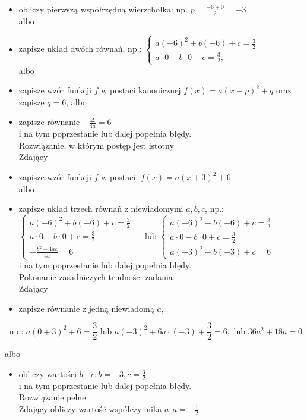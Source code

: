 \documentclass[10pt]{article}
\begin{document}
\begin{itemize}
  \item obliczy pierwszą współrzędną wierzchołka: np. $p=\frac{-6+0}{2}=-3$\\
albo
  \item zapisze układ dwóch równań, np.: $\left\{\begin{array}{l}a(-6)^{2}+b(-6)+c=\frac{3}{2} \\ a \cdot 0-b \cdot 0+c=\frac{3}{2},\end{array}\right.$\\
albo
  \item zapisze wzór funkcji $f$ w postaci kanonicznej $f(x)=a(x-p)^{2}+q$ oraz zapisze $q=6$, albo
  \item zapisze równanie $-\frac{\Delta}{4 a}=6$\\
i na tym poprzestanie lub dalej popełnia błędy.\\
Rozwiązanie, w którym postęp jest istotny\\
Zdający
  \item zapisze wzór funkcji $f$ w postaci: $f(x)=a(x+3)^{2}+6$\\
albo
  \item zapisze układ trzech równań z niewiadomymi $a, b, c$, np.:\\
$\left\{\begin{array}{l}a(-6)^{2}+b(-6)+c=\frac{3}{2} \\ a \cdot 0-b \cdot 0+c=\frac{3}{2} \\ -\frac{b^{2}-4 a c}{4 a}=6\end{array} \quad\right.$ lub $\left\{\begin{array}{l}a(-6)^{2}+b(-6)+c=\frac{3}{2} \\ a \cdot 0-b \cdot 0+c=\frac{3}{2} \\ a(-3)^{2}+b(-3)+c=6\end{array}\right.$\\
i na tym poprzestanie lub dalej popełnia błędy.\\
Pokonanie zasadniczych trudności zadania\\
Zdający
  \item zapisze równanie z jedną niewiadomą $a$,
\end{itemize}

$$
\text { np.: } a(0+3)^{2}+6=\frac{3}{2} \text { lub } a(-3)^{2}+6 a \cdot(-3)+\frac{3}{2}=6, \text { lub } 36 a^{2}+18 a=0
$$

albo

\begin{itemize}
  \item obliczy wartości $b$ i $c: b=-3, c=\frac{3}{2}$\\
i na tym poprzestanie lub dalej popełnia błędy.\\
Rozwiązanie pelne\\
Zdający obliczy wartość współczynnika $a: a=-\frac{1}{2}$.
\end{itemize}
\end{document}
